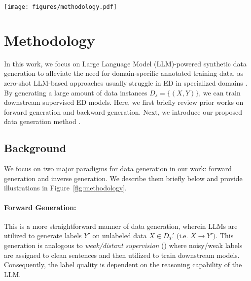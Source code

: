 \begin{figure*}[t]
    \centering
    \texttt{[image: figures/methodology.pdf]}
    \caption{Model Architecture Diagram. Top left - illustration of forward generation. Bottom left - illustration of inverse generation. Right - \modelName{} and its four components. We first extract domain-specific triggers via forward generation, then generate passages using inverse generation. Forward generation refines missing events, and we sample $N$ data points per event for downstream training.}
    \label{fig:methodology}
\end{figure*}

\section{Methodology}
\label{sec:methodology}

In this work, we focus on Large Language Model (LLM)-powered synthetic data generation to alleviate the need for domain-specific annotated training data, as zero-shot LLM-based approaches usually struggle in ED in specialized domains \cite{huang-etal-2024-textee}.
By generating a large amount of data instances $D_s = \{(X,Y)\}$, we can train downstream supervised ED models.
Here, we first briefly review prior works on forward generation and backward generation. Next, we introduce our proposed data generation method \modelName.

\subsection{Background}
\label{sec:methodology-background}

We focus on two major paradigms for data generation in our work: forward generation and inverse generation. We describe them briefly below and provide illustrations in Figure~\ref{fig:methodology}.

\paragraph{Forward Generation:}
This is a more straightforward manner of data generation, wherein LLMs are utilized to generate labels $Y'$ on unlabeled data $X \in D_T'$ (i.e. $X \rightarrow Y')$.
This generation is analogous to \textit{weak/distant supervision} (\extracttrain) \cite{mintz-etal-2009-distant, DBLP:journals/corr/abs-2109-09193, DBLP:journals/corr/abs-2106-06168} where noisy/weak labels are assigned to clean sentences and then utilized to train downstream models.
Consequently, the label quality is dependent on the reasoning capability of the LLM.


